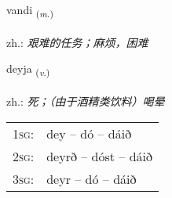 \documentclass[frontgrid, backgrid]{flacards}\usepackage[]{graphicx}\usepackage[]{xcolor}
\begin{document}
\renewcommand{\flhead}{\vskip5pt \fboxsep=0pt {\small\bfseries\footnotesize Nafnorð | 名词}}
\renewcommand{\fcfoot}{\vskip5pt \fboxsep=0pt \hspace{2pt}{\small\bfseries\footnotesize 1K}}

\renewcommand{\blhead}{\vskip5pt {\small\bfseries\footnotesize Nafnorð | 名词 }}
\renewcommand{\bcfoot}{\vskip5pt \hspace{2pt}{\small\bfseries\footnotesize 1K}}


{vandi \small{\textsubscript{(\textit{m.})}} \\[1ex] %
\textphonetic{[vantɪ]} \\
zh.: \emph{艰难的任务；麻烦，困难} \\  [2ex]
\renewcommand*{\arraystretch}{0.8}
}

\renewcommand{\flhead}{\vskip5pt \fboxsep=0pt {\small\bfseries\footnotesize Sagnorð | 动词}}
\renewcommand{\fcfoot}{\vskip5pt \fboxsep=0pt \hspace{2pt}{\small\bfseries\footnotesize 1K}}

\renewcommand{\blhead}{\vskip5pt {\small\bfseries\footnotesize Sagnorð | 动词 }}
\renewcommand{\bcfoot}{\vskip5pt \hspace{2pt}{\small\bfseries\footnotesize 1K}}


{deyja \small{\textsubscript{(\textit{v.})}} \\[1ex] %
\textphonetic{[teiːja]} \\
zh.: \emph{死；（由于酒精类饮料）喝晕} \\  [2ex]
\renewcommand*{\arraystretch}{0.8}
\begin{tabular}{p{1cm}l}
\textsc{1sg}: & dey -- dó -- dáið \\ 
\textsc{2sg}: & deyrð -- dóst -- dáið \\ 
\textsc{3sg}: & deyr -- dó -- dáið \\ 
\end{tabular}
}
\end{document}
